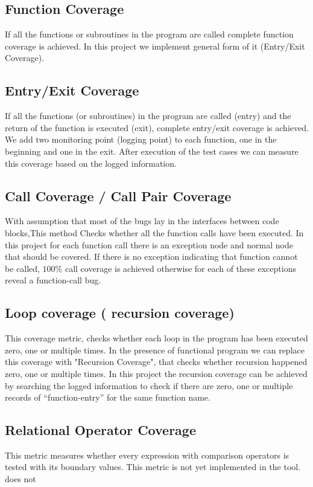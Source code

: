 \documentclass[12pt,a4paper]{report}
\begin{document}
\subsection{Function Coverage}
If all the functions or subroutines in the program are called complete function coverage is achieved.
In this project we implement general form of it (Entry/Exit Coverage).

\subsection{Entry/Exit Coverage}
If all the functions (or subroutines) in the program are called (entry) and the return of the function is executed (exit),  complete entry/exit
 coverage is achieved.
We add two monitoring point (logging point) to each function, one in the beginning and one in the exit. After execution of the test cases we can
 measure this coverage based on the logged information. 

\subsection{Call Coverage / Call Pair Coverage}
With assumption that most of the bugs lay in the interfaces between code blocks,This method Checks whether all the function calls have been executed.
In this project for each function call there is an exception node and normal node that should be covered. If there is no exception indicating that function 
cannot be called, $100\%$ call coverage is achieved otherwise for each of these exceptions reveal a function-call bug.

\subsection{Loop coverage ( recursion coverage)}
This coverage metric, checks whether each loop in the program has been executed zero, one or multiple times. In the presence of functional program we can
 replace this coverage with "Recursion Coverage", that checks whether recursion happened zero, one or multiple times. In this project the recursion
 coverage can be achieved by searching the logged information to check if there are zero, one or multiple records of “function-entry” for the same function
 name. %

\subsection{Relational Operator Coverage}
This metric measures whether every expression with comparison operators is tested with its boundary values.
This metric is not yet implemented in the tool.
does not
\end{document}
